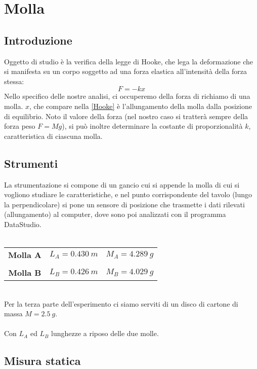 
\chapter{Molla}

\section{Introduzione}
Oggetto di studio è la verifica della legge di Hooke, che lega la deformazione che si manifesta su un corpo soggetto ad una forza elastica all'intensità della forza stessa:
\begin{equation}\label{Hooke}
F=-kx
\end{equation}
Nello specifico delle nostre analisi, ci occuperemo della forza di richiamo di una molla. $x$, che compare nella \ref{Hooke} è l'allungamento della molla dalla posizione di equilibrio.
Noto il valore della forza (nel nostro caso si tratterà sempre della forza peso $F=Mg$), si può inoltre determinare la costante di proporzionalità $k$, caratteristica di ciascuna molla.

\section{Strumenti}
La strumentazione si compone di un gancio cui si appende la molla di cui si vogliono studiare le caratteristiche, e nel punto corrispondente del tavolo (lungo la perpendicolare) si pone un sensore di posizione che trasmette i dati rilevati (allungamento) al computer, dove sono poi analizzati con il programma DataStudio.\\
\\
\begin{tabular}{c c c}
\textbf{Molla A} & \hspace{1.5cm} $L_A=0.430\ m$ & \hspace{1.5cm} $M_A=4.289\ g$\\
\\
\textbf{Molla B} & \hspace{1.5cm} $L_B=0.426\ m$ & \hspace{1.5cm} $M_B=4.029\ g$\\
\end{tabular}
\\
Per la terza parte dell'esperimento ci siamo serviti di un disco di cartone di massa $M=2.5\ g$. 
\\
\\
Con $L_A$ ed $L_B$ lunghezze a riposo delle due molle.

\section{Misura statica}

